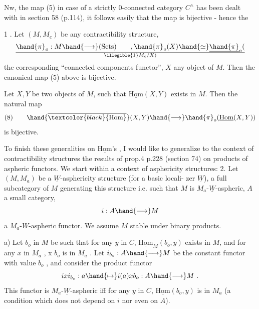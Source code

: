 
 Nw,  the map (5) in case of a strictly  0-connected category
\hand{(}$C^{\wedge}$\hand{)} has been dealt with in section 58 (p.114), it follows easily that the
map is bijective - hence the

\hand{\uline{\textcolor{black}{Proposition}}} 1 . Let $(M,M_c)$ be any contractibility structure, 
\[ \hand{\pi}_o : M \hand{\longrightarrow} \text{(Sets)} \qquad , \hand{\pi}_o(X) \hand{\simeq} \underline{\hand{\pi}}_o(\over{\illegible{1}}{M_c}/X) \] 
the corresponding ``connected components functor'', $X$ any object of $M$. Then
the canonical map (5) above is bijective.

\hand{\uline{\textcolor{black}{Corollary}}} Let $X,Y$ be two objects of $M$, such that $\underline{\mathrm{Hom}}(X,Y)$ exists in $M$.
Then the natural map
\[ (8) \qquad \hand{\overline{\textcolor{black}{\mathrm{Hom}}}}(X,Y) \hand{\longrightarrow} \hand{\pi}_o(\underline{\mathrm{Hom}}(X,Y)) \]
is bijective. \margin{$\lfloor$\rule{2.5cm}{0.4pt}}

\margin{$\ulcorner$\rule{2.5cm}{0.4pt}} To finish these generalities on $\underline{\mathrm{Hom}}$'s , I would like to generalize
to the context of contractibility structures the results of prop.4 p.228
(section 74) on products of aspheric functors. We start within a context
of asphericity structures:
\hand{\uline{\textcolor{black}{Proposition}}} 2. Let $(M,M_a)$ be a $\underline{W}$-asphericity structure (for a basic locali-%
zer $\underline{W}$),  a full subcategory of $M$ generating this structure i.e. such that
 \hand{$\to$} $M$ is $M_a$-$\underline{W}$-aspheric, $A$ a small category,
\[ i: A \hand{\longrightarrow} M \]
a  $M_a$-$\underline{W}$-aspheric functor. We assume $M$ stable under binary products.

a) Let $b_o$ in $M$ be such that for any $y$ in $C$, $\underline{\mathrm{Hom}}_M(b_o,y)$ exists in $M$,
and for any $x$ in $M_a$ ,  x $b_o$ is in $M_a$ . Let $i_{b_o} : A \hand{\longrightarrow} M$ be the constant
functor with value $b_o$ , and consider the product functor
\[ ixi_{b_o} : a \hand{\mapsto} i(a)xb_o : A \hand{\longrightarrow} M \ . \]
This functor is $M_a$-$\underline{W}$-aspheric iff for any $y$ in $C$, $\underline{\mathrm{Hom}}(b_o,y)$ is in $M_a$
(a condition which does not depend on $i$ nor even on $A$).

